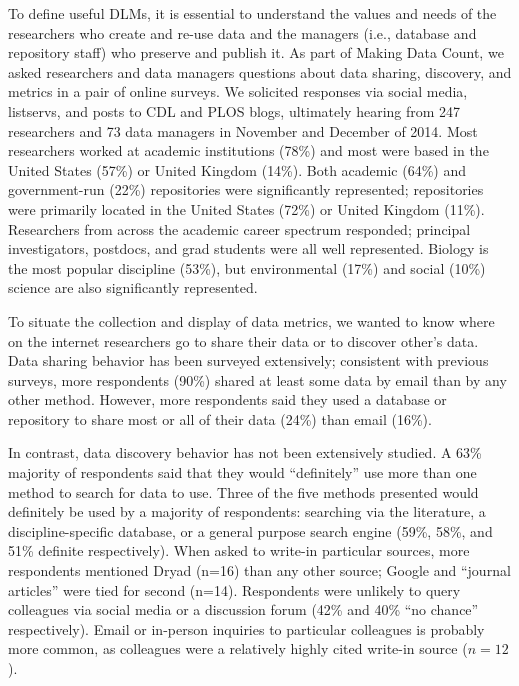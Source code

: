 \documentclass[english]{article}
\begin{document}
To define useful DLMs, it is essential to understand the values and needs of the researchers who create and re-use data and the managers (i.e., database and repository staff) who preserve and publish it.
As part of Making Data Count, we asked researchers and data managers questions about data sharing, discovery, and metrics in a pair of online surveys.
We solicited responses via social media, listservs, and posts to CDL and PLOS blogs, ultimately hearing from 247 researchers and 73 data managers in November and December of 2014.
Most researchers worked at academic institutions (78\%) and most were based in the United States (57\%) or United Kingdom (14\%).
Both academic (64\%) and government-run (22\%) repositories were significantly represented; repositories were primarily located in the United States (72\%) or United Kingdom (11\%).
Researchers from across the academic career spectrum responded; principal investigators, postdocs, and grad students were all well represented. 
Biology is the most popular discipline (53\%), but environmental (17\%) and social (10\%) science are also significantly represented. 


To situate the collection and display of data metrics, we wanted to know where on the internet researchers go to share their data or to discover other's data. 
Data sharing behavior has been surveyed extensively; consistent with previous surveys\cite{@akers_disciplinary_2013, @wallis_if_2013, @kratz_researcher_2015}, more respondents (90\%) shared at least some data by email than by any other method. 
However, more respondents said they used a database or repository to share most or all of their data (24\%) than email (16\%). 

In contrast, data discovery behavior has not been extensively studied.
A 63\% majority of respondents said that they would ``definitely'' use more than one method to search for data to use. 
Three of the five methods presented would definitely be used by a majority of respondents: searching via the literature, a discipline-specific database, or a general purpose search engine (59\%, 58\%, and 51\% definite respectively). 
When asked to write-in particular sources, more respondents mentioned Dryad (n=16) than any other source; Google and ``journal articles'' were tied for second (n=14). 
Respondents were unlikely to query colleagues via social media or a discussion forum (42\% and 40\% ``no chance'' respectively). 
Email or in-person inquiries to particular colleagues is probably more common, as colleagues were a relatively highly cited write-in source ($n=12$).
\end{document}
